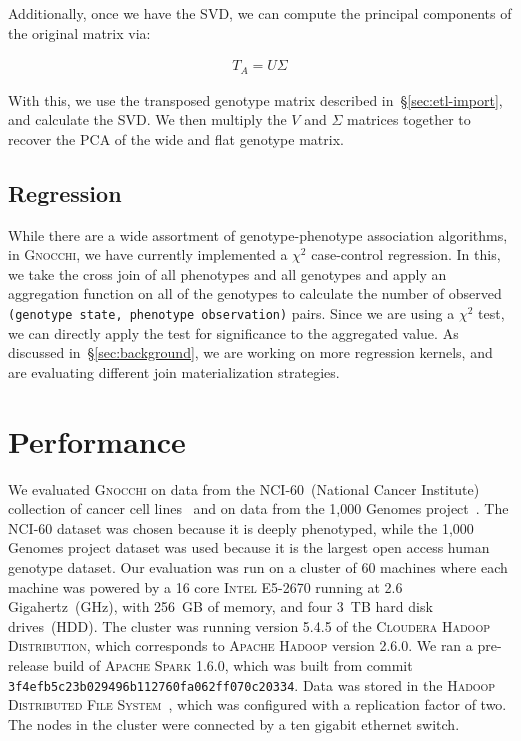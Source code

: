 \documentclass[11pt]{article} %
\begin{document}
Additionally, once we have the SVD, we can compute the principal components
of the original matrix via:

\begin{align}
T_A = U \Sigma
\end{align}

With this, we use the transposed genotype matrix described
in~\S\ref{sec:etl-import}, and calculate the SVD. We then multiply the
$V$ and $\Sigma$ matrices together to recover the PCA of the wide and flat
genotype matrix.

\subsection{Regression}
\label{sec:regression}

While there are a wide assortment of genotype-phenotype association algorithms,
in \textsc{Gnocchi}, we have currently implemented a $\chi^2$ case-control
regression. In this, we take the cross join of all phenotypes and all genotypes
and apply an aggregation function on all of the genotypes to calculate the number
of observed \texttt{(genotype state, phenotype observation)} pairs. Since we are
using a $\chi^2$ test, we can directly apply the test for significance to the
aggregated value. As discussed in~\S\ref{sec:background}, we are working on more
regression kernels, and are evaluating different join materialization
strategies.

\section{Performance}
\label{sec:performance}

We evaluated \textsc{Gnocchi} on data from the NCI-60~(National Cancer
Institute) collection of cancer cell lines~\cite{shankavaram09, reinhold12} and
on data from the 1,000 Genomes project~\cite{1kg}. The NCI-60 dataset was chosen
because it is deeply phenotyped, while the 1,000 Genomes project dataset was
used because it is the largest open access human genotype dataset. Our
evaluation was run on a cluster of 60 machines where each machine was powered
by a 16 core \textsc{Intel E5-2670} running at 2.6 Gigahertz~(GHz), with 256~GB
of memory, and four 3~TB hard disk drives~(HDD). The cluster was running version
5.4.5 of the \textsc{Cloudera Hadoop Distribution}, which corresponds to
\textsc{Apache Hadoop} version 2.6.0. We ran a pre-release build of
\textsc{Apache Spark} 1.6.0, which was built from commit
\texttt{3f4efb5c23b029496b112760fa062ff070c20334}. Data was stored in the
\textsc{Hadoop Distributed File System}~\cite{shvachko10}, which was configured
with a replication factor of two. The nodes in the cluster were connected by a
ten gigabit ethernet switch.
\end{document}
